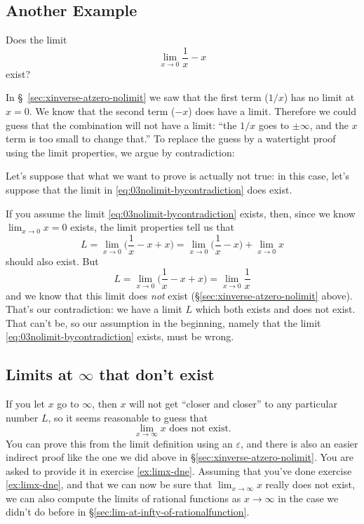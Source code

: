 \subsection{Another Example}
Does the limit
\begin{equation}
  \label{eq:03nolimit-bycontradiction}
  \lim_{x\to 0} \frac 1x-x
\end{equation}
exist? 

In \S~\ref{sec:xinverse-atzero-nolimit} we saw that the first term
($1/x$) has no limit at $x=0$. We know that the second term ($-x$) does have
a limit.  Therefore we could guess that the combination will not have
a limit:  ``the $1/x$ goes to $\pm\infty$, and the $x$ term is too
small to change that.''  To replace the guess by a watertight proof
using the limit properties, we argue by contradiction:

Let's suppose that what we want to prove is actually not true: in this
case, let's suppose that the limit in \eqref{eq:03nolimit-bycontradiction} does
exist.  

If you assume the limit \eqref{eq:03nolimit-bycontradiction} exists,
then, since we know $\lim_{x\to0}x=0$ exists, the limit properties
tell us that
\[
L=
\lim_{x\to 0} \bigl(\frac1x-x +x\bigr) 
=\lim_{x\to  0} \bigl(\frac1x-x\bigr) + \lim_{x\to 0} x
\]
should also exist.  But
\[
L=\lim_{x\to 0} \bigl(\frac1x-x +x\bigr) 
=\lim_{x\to  0} \frac1x
\]
and we know that this limit does \emph{not} exist
(\S\ref{sec:xinverse-atzero-nolimit} above).  
That's our contradiction:  we have a limit $L$ which both exists and does
not exist.  That  can't be, so our assumption in the beginning, namely
that the limit \eqref{eq:03nolimit-bycontradiction} exists, must be wrong.


\subsection{Limits at $\infty$ that don't exist}%
\label{ex:lim-at-infty-that-fails}%
If you let $x$ go to $\infty$, then $x$ will not get ``closer and closer''
to any particular number $L$, so it seems reasonable to guess that
\[
\lim_{x\to\infty}x\text{ does not exist.}
\]
You can prove this from the limit definition using an $\varepsilon$, and
there is also an easier indirect proof like the one we did above in
\S\ref{sec:xinverse-atzero-nolimit}.  You are
asked to provide it in exercise \ref{ex:limx-dne}.
Assuming that you've done exercise \ref{ex:limx-dne}, and that
we can now be sure that $\lim_{x\to\infty} x$ really does not exist,
we can also compute the limits of rational functions as $x\to\infty$
in the case we didn't do before in
\S\ref{sec:lim-at-infty-of-rationalfunction}.

